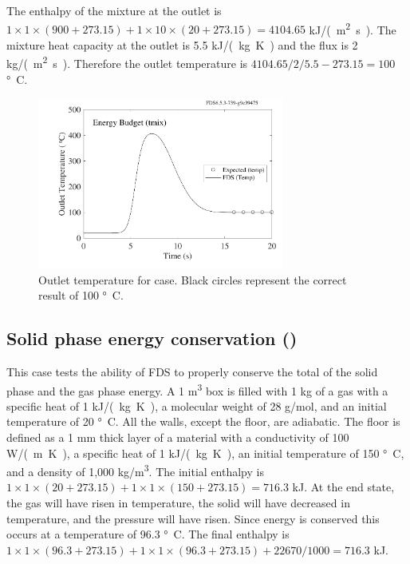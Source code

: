 \documentclass[11pt]{book}
\begin{document}
The enthalpy of the mixture at the outlet is $1 \times 1 \times (900+273.15) + 1 \times 10 \times (20+273.15) = 4104.65$ \si{kJ/(m^2.s)}.  The mixture heat capacity at the outlet is 5.5 \si{kJ/(kg.K)} and the flux is 2 \si{kg/(m^2.s)}.  Therefore the outlet temperature is $4104.65/2/5.5 - 273.15 = 100$ \si{\degree C}.
\begin{figure}[ht]
\centering
\includegraphics[width=3.2in]{SCRIPT_FIGURES/energy_budget_tmix}
\caption[The  test case]{\label{fig_outlet_temperature} Outlet temperature for  case.  Black circles represent the correct result of 100 \si{\degree C}.}
\end{figure}


\subsection{Solid phase energy conservation (\texorpdfstring{}{energy\_budget\_solid})}
\label{energy_budget_solid}

This case tests the ability of FDS to properly conserve the total of the solid phase and the gas phase energy.  A 1 \si{m^3} box is filled with 1 kg of a gas with a specific heat of 1 \si{kJ/(kg.K)}, a molecular weight of 28 g/mol, and an initial temperature of 20 \si{\degree C}.  All the walls, except the floor, are adiabatic.  The floor is defined as a 1 mm thick layer of a material with a conductivity of 100 \si{W/(m.K)},  a specific heat of 1 \si{kJ/(kg.K)}, an initial temperature of 150 \si{\degree C}, and a density of 1,000 \si{kg/m^3}.  The initial enthalpy is $1 \times 1 \times (20+273.15) + 1 \times 1 \times (150+273.15)  =  716.3$ kJ.  At the end state, the gas will have risen in temperature, the solid will have decreased in temperature, and the pressure will have risen.  Since energy is conserved this occurs at a temperature of 96.3 \si{\degree C}.  The final enthalpy is $1 \times 1 \times (96.3+273.15) + 1 \times 1 \times (96.3+273.15) + 22670 / 1000  =  716.3$ kJ.
\end{document}
